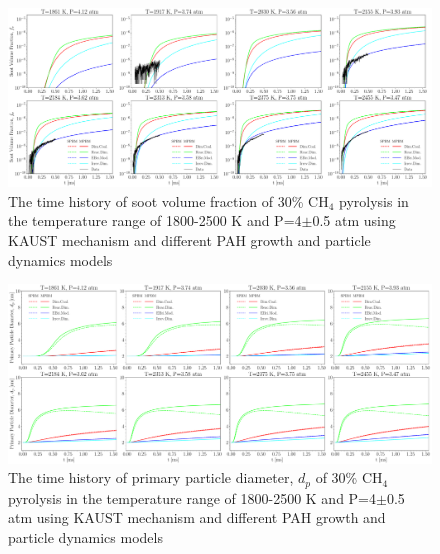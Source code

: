
\begin{figure}[H]
	\centering
	\includegraphics[width=1\textwidth]{Figures/Results/Shocktube/Stanford/june/stsh_cases_vf.pdf}
	\caption{The time history of soot volume fraction of 30\% $\mathrm{CH_4}$ pyrolysis in the temperature range of 1800-2500 K and P=4$\pm$0.5 atm using KAUST mechanism and different PAH growth and particle dynamics models}
	\label{fig:shocktubestcasevf} 
\end{figure}


\begin{figure}[H]
	\centering
	\includegraphics[width=1\textwidth]{Figures/Results/Shocktube/Stanford/june/stsh_cases_dp.pdf}
	\caption{The time history of primary particle diameter, $d_p$ of 30\% $\mathrm{CH_4}$ pyrolysis in the temperature range of 1800-2500 K and P=4$\pm$0.5 atm using KAUST mechanism and different PAH growth and particle dynamics models}
	\label{fig:shocktubestcasedp} 
\end{figure}


